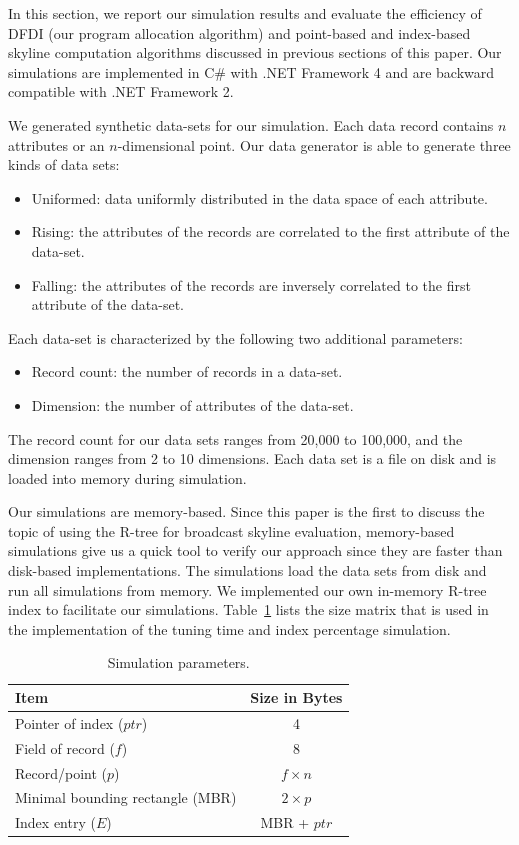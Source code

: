 In this section, we report our simulation results and evaluate the
efficiency of DFDI (our program allocation algorithm) and
point-based and index-based skyline computation algorithms
discussed in previous sections of this paper. Our simulations are
implemented in C\# with .NET Framework 4 and are backward
compatible with .NET Framework 2.

We generated synthetic data-sets for our simulation. Each data
record contains $n$ attributes or an $n$-dimensional point. Our
data generator is able to generate three kinds of data sets:

\begin{itemize}
\item Uniformed: data uniformly distributed in the data space of each
    attribute.
\item Rising: the attributes of the records are correlated to the first
    attribute of the data-set.
\item Falling: the attributes of the records are inversely correlated to
    the first attribute of the data-set.
\end{itemize}

Each data-set is characterized by the following two additional parameters:

\begin{itemize}
\item Record count: the number of records in a data-set.
\item Dimension: the number of attributes of the data-set.
\end{itemize}

The record count for our data sets ranges from 20,000 to 100,000,
and the dimension ranges from 2 to 10 dimensions. Each data set is
a file on disk and is loaded into memory during simulation.

Our simulations are memory-based. Since this paper is the first to
discuss the topic of using the R-tree for broadcast skyline
evaluation, memory-based simulations give us a quick tool to
verify our approach since they are faster than disk-based
implementations. The simulations load the data sets from disk and
run all simulations from memory. We implemented our own in-memory
R-tree index to facilitate our simulations.
Table~\ref{tab:sim_size} lists the size matrix that is used in the
implementation of the tuning time and index percentage simulation.

\begin{table}[h]
\caption{Simulation parameters.}
\label{tab:sim_size}
\centering
\begin{tabular}{l|c}
\hline
{\bf Item} & {\bf Size in Bytes}\\
\hline
Pointer of index ($ptr$) & 4\\
Field of record ($f$) & 8\\
Record/point ($p$) & $f \times n$\\
Minimal bounding rectangle (MBR) & $2 \times p$\\
Index entry ($E$) & MBR + $ptr$\\
\hline
\end{tabular}
\end{table}

